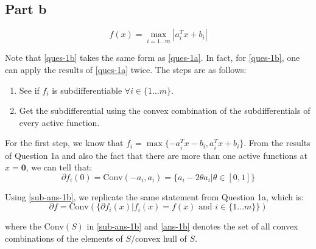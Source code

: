 \documentclass[11pt]{article}
\begin{document}
\subsection*{Part b}
\begin{flushleft}
\begin{equation}
\label{ques-1b}
\displaystyle f(x) = \max_{i=1\ldots m} |a_{i}^{T}x + b_{i}|
\end{equation}

Note that \ref{ques-1b} takes the same form as \ref{ques-1a}. In fact, for \ref{ques-1b}, one can apply the results of \ref{ques-1a} twice. 
The steps are as follows:
\begin{enumerate}
\item See if \(f_{i}\) is subdifferentiable \(\forall i \in \{1 \ldots m\}\).
\item Get the subdifferential using the convex combination of the subdifferentials of every active function.
\end{enumerate}

For the first step, we know that \(\displaystyle f_{i} = \max \{-a_{i}^{T}x - b_{i}, a_{i}^Tx + b_{i}\}\). From the results of Question 1a and also the fact that there are more than one active functions at \(x = \mathbf{0}\), we can tell that:
\begin{equation}
\label{sub-ans-1b}
\partial f_{i}(0) = \text{Conv}(-a_{i}, a_{i}) = \{a_{i} - 2\theta a_{i} | \theta \in [0, 1]\}
\end{equation}

Using \ref{sub-ans-1b}, we replicate the same statement from Question 1a, which is:
\begin{equation}
\label{ans-1b}
\partial f = \text{Conv}\left(\{\partial f_{i}(x) | f_{i}(x) = f(x) \text{ and } i \in \{1 \ldots m\}\}\right)
\end{equation}

where the \(\text{Conv}(S)\) in \ref{sub-ans-1b} and \ref{ans-1b} denotes the set of all convex combinations of the elements of \(S\)/convex hull of \(S\).

\end{flushleft}
\end{document}
